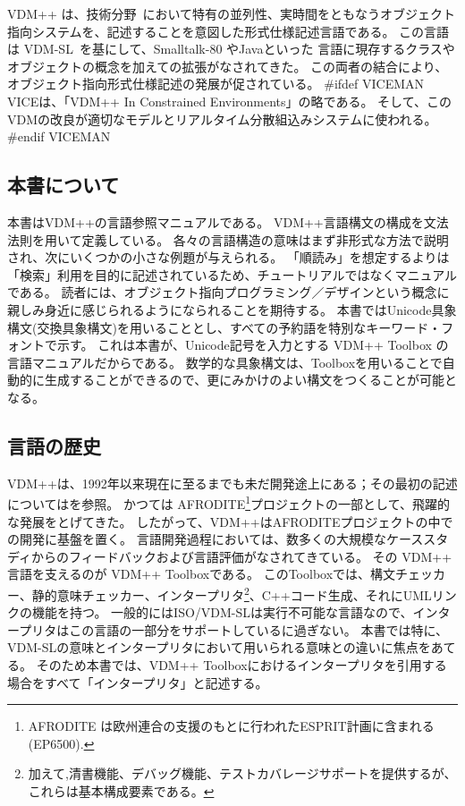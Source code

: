 \documentclass[\pformat,12pt]{jarticle}
\newcommand{\vdmsl}{VDM-SL}
\newcommand{\vdmpp}{VDM++}
\begin{document}
{\vdmpp} は、技術分野~\cite{Fitzgerald&98}において特有の並列性、実時間をともなうオブジェクト指向システムを、記述することを意図した形式仕様記述言語である。
この言語は \vdmsl~\cite{ISOVDM96}を基にして、Smalltalk-80 やJavaといった
言語に現存するクラスやオブジェクトの概念を加えての拡張がなされてきた。
この両者の結合により、オブジェクト指向形式仕様記述の発展が促されている。
#ifdef VICEMAN
VICEは、「VDM++ In Constrained Environments」の略である。
そして、このVDMの改良が適切なモデルとリアルタイム分散組込みシステムに使われる。 \cite{Verhoef&06b}
#endif VICEMAN

\subsection{本書について}

本書は{\vdmpp}の言語参照マニュアルである。
{\vdmpp}言語構文の構成を文法法則を用いて定義している。
各々の言語構造の意味はまず非形式な方法で説明され、次にいくつかの小さな例題が与えられる。
「順読み」を想定するよりは「検索」利用を目的に記述されているため、チュートリアルではなくマニュアルである。
読者には、オブジェクト指向プログラミング／デザインという概念に親しみ身近に感じられるようになられることを期待する。
本書ではUnicode具象構文(交換具象構文)を用いることとし、すべての予約語を特別なキーワード・フォントで示す。
これは本書が、Unicode記号を入力とする {\vdmpp} Toolbox の言語マニュアルだからである。
数学的な具象構文は、Toolboxを用いることで自動的に生成することができるので、更にみかけのよい構文をつくることが可能となる。

\subsection{言語の歴史}

{\vdmpp}は、1992年以来現在に至るまでも未だ開発途上にある；その最初の記述については\cite{Durr92a}を参照。
かつては AFRODITE\footnote{AFRODITE は欧州連合の支援のもとに行われたESPRIT計画に含まれる(EP6500).}プロジェクトの一部として、飛躍的な発展をとげてきた。
したがって、{\vdmpp}はAFRODITEプロジェクトの中での開発に基盤を置く。 
言語開発過程においては、数多くの大規模なケーススタディからのフィードバックおよび言語評価がなされてきている。
その {\vdmpp} 言語を支えるのが  {\vdmpp} Toolboxである。
このToolboxでは、構文チェッカー、静的意味チェッカー、インタープリタ\footnote{加えて,清書機能、デバッグ機能、テストカバレージサポートを提供するが、これらは基本構成要素である。}、C++コード生成、それにUMLリンクの機能を持つ。
一般的にはISO/VDM-SLは実行不可能な言語なので、インタープリタはこの言語の一部分をサポートしているに過ぎない。
本書では特に、VDM-SLの意味とインタープリタにおいて用いられる意味との違いに焦点をあてる。
そのため本書では、{\vdmpp} Toolboxにおけるインタープリタを引用する場合をすべて「インタープリタ」と記述する。
\end{document}
